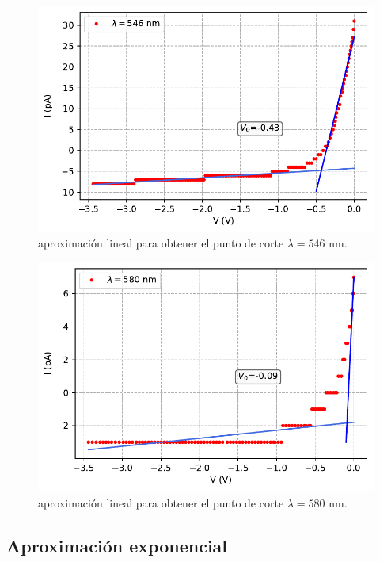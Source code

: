 \documentclass[12pt,a4paper]{article}
\numberwithin{equation}{section}
\numberwithin{table}{section}
\numberwithin{figure}{section}
\begin{document}
\begin{figure}[h!]  \centering
\includegraphics[scale=0.97]{Datos_cortes_4.pdf}
\caption{aproximación lineal para obtener el punto de corte $\lambda=546$ nm.}
\label{Fig:6.1.4}
\end{figure}
\newpage

\begin{figure}[h!]  \centering
\includegraphics[scale=0.97]{Datos_cortes_5.pdf}
\caption{aproximación lineal para obtener el punto de corte $\lambda=580$ nm.}
\label{Fig:6.1.5}
\end{figure}




\subsection{Aproximación exponencial} \label{Subsec:6.2}
\end{document}
